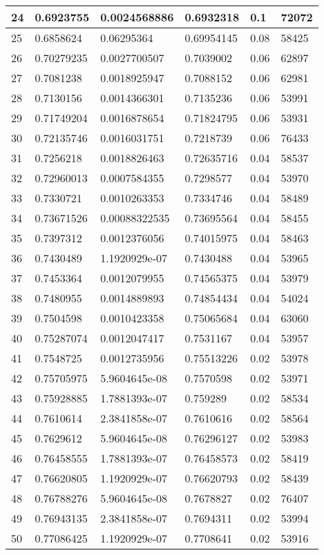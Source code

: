 \begin{longtable}{|l|l|l|l|l|l|}
24 & 0.6923755 & 0.0024568886 & 0.6932318 & 0.1 & 72072 \\ \hline 
25 & 0.6858624 & 0.06295364 & 0.69954145 & 0.08 & 58425 \\ \hline 
26 & 0.70279235 & 0.0027700507 & 0.7039002 & 0.06 & 62897 \\ \hline 
27 & 0.7081238 & 0.0018925947 & 0.7088152 & 0.06 & 62981 \\ \hline 
28 & 0.7130156 & 0.0014366301 & 0.7135236 & 0.06 & 53991 \\ \hline 
29 & 0.71749204 & 0.0016878654 & 0.71824795 & 0.06 & 53931 \\ \hline 
30 & 0.72135746 & 0.0016031751 & 0.7218739 & 0.06 & 76433 \\ \hline 
31 & 0.7256218 & 0.0018826463 & 0.72635716 & 0.04 & 58537 \\ \hline 
32 & 0.72960013 & 0.0007584355 & 0.7298577 & 0.04 & 53970 \\ \hline 
33 & 0.7330721 & 0.0010263353 & 0.7334746 & 0.04 & 58489 \\ \hline 
34 & 0.73671526 & 0.00088322535 & 0.73695564 & 0.04 & 58455 \\ \hline 
35 & 0.7397312 & 0.0012376056 & 0.74015975 & 0.04 & 58463 \\ \hline 
36 & 0.7430489 & 1.1920929e-07 & 0.7430488 & 0.04 & 53965 \\ \hline 
37 & 0.7453364 & 0.0012079955 & 0.74565375 & 0.04 & 53979 \\ \hline 
38 & 0.7480955 & 0.0014889893 & 0.74854434 & 0.04 & 54024 \\ \hline 
39 & 0.7504598 & 0.0010423358 & 0.75065684 & 0.04 & 63060 \\ \hline 
40 & 0.75287074 & 0.0012047417 & 0.7531167 & 0.04 & 53957 \\ \hline 
41 & 0.7548725 & 0.0012735956 & 0.75513226 & 0.02 & 53978 \\ \hline 
42 & 0.75705975 & 5.9604645e-08 & 0.7570598 & 0.02 & 53971 \\ \hline 
43 & 0.75928885 & 1.7881393e-07 & 0.759289 & 0.02 & 58534 \\ \hline 
44 & 0.7610614 & 2.3841858e-07 & 0.7610616 & 0.02 & 58564 \\ \hline 
45 & 0.7629612 & 5.9604645e-08 & 0.76296127 & 0.02 & 53983 \\ \hline 
46 & 0.76458555 & 1.7881393e-07 & 0.76458573 & 0.02 & 58419 \\ \hline 
47 & 0.76620805 & 1.1920929e-07 & 0.76620793 & 0.02 & 58439 \\ \hline 
48 & 0.76788276 & 5.9604645e-08 & 0.7678827 & 0.02 & 76407 \\ \hline 
49 & 0.76943135 & 2.3841858e-07 & 0.7694311 & 0.02 & 53994 \\ \hline 
50 & 0.77086425 & 1.1920929e-07 & 0.7708641 & 0.02 & 53916 \\ \hline 
\end{longtable}